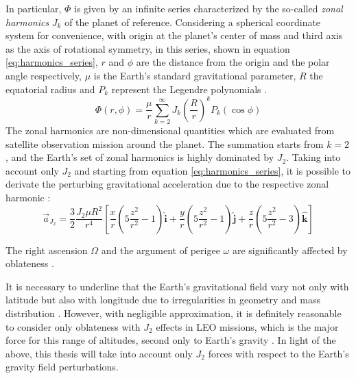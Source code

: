 In particular, $\Phi$ is given by an infinite series characterized by the so-called \textit{zonal harmonics} $J_k$ of the planet of reference.
Considering a spherical coordinate system for convenience, with origin at the planet's center of mass and third axis as the axis of rotational symmetry,
in this series, shown in equation \ref{eq:harmonics_series}, $r$ and $\phi$ are the distance from the origin and the polar angle respectively, $\mu$ is the Earth's standard gravitational parameter, $R$ the equatorial radius and $P_k$ represent the Legendre polynomials \cite{curtis2020orbital}.
\begin{equation} \label{eq:harmonics_series}
    \Phi (r,\phi) = \frac{\mu}{r} \sum_{k=2}^{\infty} J_k \left(\frac{R}{r} \right)^k P_k (\cos{\phi})
\end{equation}
The zonal harmonics are non-dimensional quantities which are evaluated from satellite observation mission around the planet.
The summation starts from $k = 2$, and the Earth's set of zonal harmonics is highly dominated by $J_2$.
Taking into account only $J_2$ and starting from equation \ref{eq:harmonics_series}, it is possible to derivate the perturbing gravitational acceleration due to the respective zonal harmonic \cite{curtis2020orbital}:
\begin{equation} \label{eq:j2_acc}
    \vec{a}_{J_2} = \frac{3}{2} \frac{J_2 \mu R^2}{r^4} \left[\frac{x}{r}\left(5 \frac{z^2}{r^2} - 1 \right)\hat{\textbf{i}} + \frac{y}{r}\left(5 \frac{z^2}{r^2} - 1\right)\hat{\textbf{j}} + \frac{z}{r}\left(5 \frac{z^2}{r^2} - 3\right)\hat{\textbf{k}} \right]
\end{equation}

The right ascension $\Omega$ and the argument of perigee $\omega$ are significantly affected by oblateness \cite{curtis2020orbital}.

It is necessary to underline that the Earth's gravitational field vary not only with latitude but also with longitude due to irregularities in geometry and mass distribution \cite{curtis2020orbital}.
However, with negligible approximation, it is definitely reasonable to consider only oblateness with $J_2$ effects in LEO missions, which is the major force for this range of altitudes, second only to Earth's gravity \cite{brown1998spacecraft}.
In light of the above, this thesis will take into account only $J_2$ forces with respect to the Earth's gravity field perturbations.

